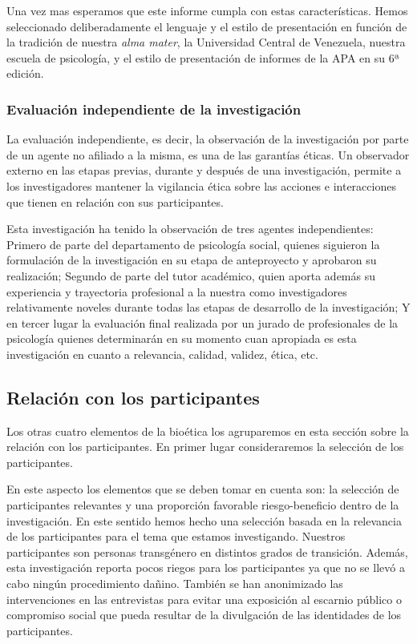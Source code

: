Una vez mas esperamos que este informe cumpla con estas características.
Hemos seleccionado deliberadamente el lenguaje y el estilo de  presentación en
función de la tradición de nuestra \emph{alma mater}, la Universidad Central
de Venezuela, nuestra escuela de psicología, y el estilo de presentación de
informes de la APA en su 6ª edición.

    \subsubsection{Evaluación independiente de la investigación}
La evaluación independiente, es decir, la observación de la investigación por
parte de un agente no afiliado a la misma, es una de las garantías éticas.
Un observador externo en las etapas previas, durante y después de una
investigación, permite a los investigadores mantener la vigilancia ética
sobre las acciones e interacciones que tienen en relación con sus
participantes.

Esta investigación ha tenido la observación de tres agentes independientes:
Primero de parte del departamento de psicología social, quienes siguieron la
formulación de la investigación en su etapa de anteproyecto y aprobaron su
realización;
Segundo de parte del tutor académico, quien aporta además su experiencia y
trayectoria profesional a la nuestra como investigadores relativamente
noveles durante todas las etapas de desarrollo de la investigación;
Y en tercer lugar la evaluación final realizada por un jurado de
profesionales de la psicología quienes determinarán en su momento cuan
apropiada es esta investigación en cuanto a relevancia, calidad, validez,
ética, etc.

\subsection{Relación con los participantes}
Los otras cuatro elementos de la bioética los agruparemos en esta sección
sobre la relación con los participantes.
En primer lugar consideraremos la selección de los participantes.

En este aspecto los elementos que se deben tomar en cuenta son: la selección
de participantes relevantes y una proporción favorable riesgo-beneficio
dentro de la investigación.
En este sentido hemos hecho una selección basada en la relevancia de los
participantes para el tema que estamos investigando.
Nuestros participantes son personas transgénero en distintos grados de
transición.
Además, esta investigación reporta pocos riegos para los participantes ya que
no se llevó a cabo ningún procedimiento dañino.
También se han anonimizado las intervenciones en las entrevistas para evitar
una exposición al escarnio público o compromiso social que pueda resultar de
la divulgación de las identidades de los participantes.


